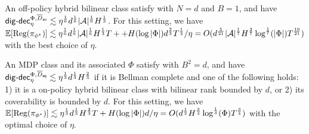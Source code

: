 \begin{example}
    An off-policy hybrid bilinear class satisfy  with $N=d$ and $B=1$, and have $\mathsf{dig}\text{-}\mathsf{dec}_\eta^{\Phi, \overline{D}_{\mathsf{av}}}\lesssim \eta^{\frac{1}{6}}d^{\frac{1}{6}}|\mathcal{A}|^{\frac{1}{6}}H^{\frac{1}{3}}$. For this setting, we have $\mathbb{E}[\text{\rm Reg}(\pi_{\phi^\star})]\lesssim \eta^{\frac{1}{6}}d^{\frac{1}{6}}|\mathcal{A}|^{\frac{1}{6}}H^{\frac{1}{3}}T + + H(\log|\Phi|)d^{\frac{2}{3}}T^{\frac{1}{3}}/\eta = O(d^{\frac{5}{21}}|\mathcal{A}|^{\frac{1}{7}}H^{\frac{3}{7}}\log^\frac{1}{7}(|\Phi|)T^{\frac{19}{21}})$ with the best choice of $\eta$. 
\end{example}

\begin{example}
   An MDP class and its associated $\Phi$ satisfy  with  $B^2=d$, and have $\mathsf{dig}\text{-}\mathsf{dec}_\eta^{\Phi, \overline{D}_{\mathsf{sq}}}\lesssim \eta^{\frac{1}{3}}d^{\frac{1}{3}}H^{\frac{2}{3}}$ if it is Bellman complete and one of the following holds: 1) it is a on-policy hybrid bilinear class with bilinear rank bounded by $d$, or 2) its coverability is bounded by $d$. For this setting, we have $\mathbb{E}[\text{\rm Reg}(\pi_{\phi^\star})]\lesssim \eta^{\frac{1}{3}}d^{\frac{1}{3}}H^{\frac{2}{3}}T + H(\log|\Phi|)d/\eta = O(d^{\frac{1}{2}}H^{\frac{3}{4}}\log^{\frac{1}{4}}(\Phi)T^{\frac{3}{4}})$ with the optimal choice of $\eta$. 
\end{example}
\fi




